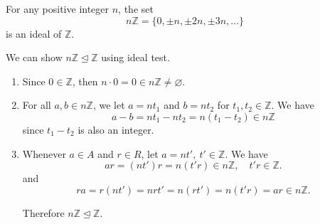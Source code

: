 \begin{example}
    For any positive integer $n$, the set 
    \[
        n\mathbb{Z} = \{ 0, \pm n, \pm 2n, \pm 3n, \ldots \}
    \]
    is an ideal of $\mathbb{Z}$.
\end{example}
\begin{solution}
    We can show $n\mathbb{Z} \unlhd \mathbb{Z}$ using ideal test.
    \begin{enumerate}
        \item Since $0 \in \mathbb{Z}$, then $n \cdot 0 = 0 \in n\mathbb{Z} \neq \varnothing$.
        \item For all $a, b \in n\mathbb{Z}$, we let $a=nt_1$ and $b=nt_2$ for $t_1, t_2 \in \mathbb{Z}$. We have 
            \[
                a - b = nt_1 - nt_2 = n(t_1 - t_2) \in n\mathbb{Z} 
            \]
            since $t_1 - t_2$ is also an integer.
        
        \item Whenever $a \in A$ and $r \in R$, let $a = nt', \> t' \in \mathbb{Z}$. We have 
            \[
                ar = (nt')r = n(t'r) \in n\mathbb{Z}, \quad t'r \in \mathbb{Z}.
            \]
            and 
            \[
                ra = r(nt') = nrt' = n(rt') = n(t'r) = ar \in n\mathbb{Z}.
            \]
        
        Therefore $n\mathbb{Z} \unlhd \mathbb{Z}$.
    \end{enumerate}
\end{solution}

